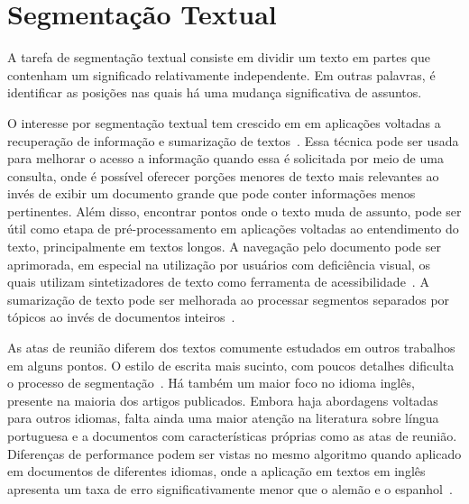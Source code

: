 		




\section{Segmentação Textual}


A tarefa de segmentação textual consiste em dividir um texto em partes que contenham um significado relativamente independente. Em outras palavras, é identificar as posições nas quais há uma mudança significativa de assuntos. 

O interesse por segmentação textual tem crescido em em aplicações voltadas a recuperação de informação %
e sumarização de textos~\cite{Maziero2016}. %
Essa técnica pode ser usada para melhorar o acesso a informação quando essa é solicitada por meio de uma consulta, onde é possível oferecer porções menores de texto mais relevantes ao invés de exibir um documento grande que pode conter informações menos pertinentes. 
%
Além disso, encontrar pontos onde o texto muda de assunto, pode ser útil como etapa de pré-processamento em aplicações voltadas ao entendimento do texto, principalmente em textos longos.
%
A navegação pelo documento pode ser aprimorada, em especial na utilização por usuários com deficiência visual, os quais utilizam  sintetizadores de texto como ferramenta de acessibilidade~\cite{Choi2000}. 
%
A sumarização de texto pode ser melhorada ao processar segmentos separados por tópicos ao invés de documentos inteiros~\cite{Bhatia2016, Maziero2016, Bokaei2016}. 




%  
As atas de reunião diferem dos textos comumente estudados em outros trabalhos em alguns pontos. O estilo de escrita mais sucinto, com poucos detalhes dificulta o processo de segmentação~\cite{Choi2001-LSA}. Há também um maior foco no idioma inglês, presente na maioria dos artigos publicados. Embora haja abordagens voltadas para outros idiomas, falta ainda uma maior atenção na literatura sobre língua portuguesa e a documentos com características próprias como as atas de reunião. Diferenças de performance podem ser vistas no mesmo algoritmo quando aplicado em documentos de diferentes idiomas, onde a aplicação em textos em inglês apresenta um taxa de erro significativamente menor que o alemão e o espanhol~\cite{Kern2009,Sitbon2004}.



